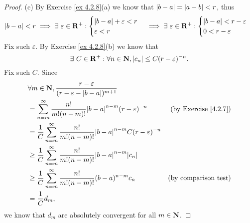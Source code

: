 \begin{proof}{(c)}
    By Exercise \ref{ex 4.2.8}(a) we know that \(\left\lvert b - a\right\rvert = \left\lvert a - b\right\rvert < r\), thus
    \[
        \left\lvert b - a\right\rvert < r \implies \exists\ \varepsilon \in \mathbf{R}^+ : \begin{cases}
            \left\lvert b - a\right\rvert + \varepsilon < r \\
            \varepsilon < r
        \end{cases} \implies \exists\ \varepsilon \in \mathbf{R}^+ : \begin{cases}
            \left\lvert b - a\right\rvert < r - \varepsilon \\
            0 < r - \varepsilon
        \end{cases}
    \]
    Fix such \(\varepsilon\).
    By Exercise \ref{ex 4.2.8}(b) we know that
    \[
        \exists\ C \in \mathbf{R}^+ : \forall n \in \mathbf{N}, \left\lvert c_n\right\rvert \leq C (r - \varepsilon)^{-n}.
    \]
    Fix such \(C\).
    Since
    \begin{align*}
         & \forall m \in \N, \frac{r - \varepsilon}{(r - \varepsilon - \abs{b - a})^{m + 1}}                                                        \\
         & = \sum_{n = m}^\infty \frac{n!}{m! (n - m)!} \abs{b - a}^{n - m} (r - \varepsilon)^{-n}               & \text{(by Exercise \ref{4.2.7})} \\
         & = \frac{1}{C} \sum_{n = m}^\infty \frac{n!}{m! (n - m)!} \abs{b - a}^{n - m} C (r - \varepsilon)^{-n}                                    \\
         & \geq \frac{1}{C} \sum_{n = m}^\infty \frac{n!}{m! (n - m)!} \abs{b - a}^{n - m} \abs{c_n}                                                \\
         & \geq \frac{1}{C} \sum_{n = m}^\infty \frac{n!}{m! (n - m)!} (b - a)^{n - m} c_n                       & \text{(by comparison test)}      \\
         & = \frac{1}{C} d_m,
    \end{align*}
    we know that \(d_m\) are absolutely convergent for all \(m \in \mathbf{N}\).
\end{proof}

